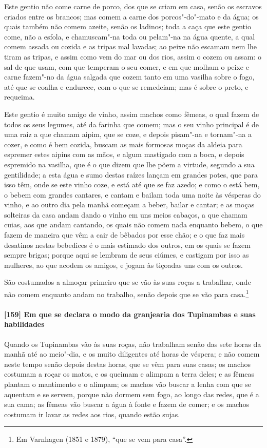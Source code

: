\begin{linenumbers}
Este gentio não come carne de porco, dos que se criam em casa, senão os escravos criados
entre os brancos; mas comem a carne dos porcos"-do"-mato e da água; os quais também não
comem azeite, senão os ladinos; toda a caça que este gentio come, não a esfola, e
chamuscam"-na toda ou pelam"-na na água quente, a qual comem assada ou cozida e as tripas
mal lavadas; ao peixe não escamam nem lhe tiram as tripas, e assim como vem do mar ou dos
rios, assim o cozem ou assam: o sal de que usam, com que temperam o seu comer, e em que
molham o peixe e carne fazem"-no da água salgada que cozem tanto em uma vasilha sobre o
fogo, até que se coalha e endurece, com o que se remedeiam; mas é sobre o preto, e
requeima.

Este gentio é muito amigo de vinho, assim machos como fêmeas, o qual fazem de todos os
seus legumes, até da farinha que comem; mas o seu vinho principal é de uma raiz a que
chamam aipim, que se coze, e depois pisam"-na e tornam"-na a cozer, e como é bem cozida,
buscam as mais formosas moças da aldeia para espremer estes aipins com as mãos, e algum
mastigado com a boca, e depois espremido na vasilha, que é o que dizem que lhe põem a
virtude, segundo a sua gentilidade; a esta água e sumo destas raízes lançam em grandes
potes, que para isso têm, onde se este vinho coze, e está até que se faz azedo; e como o
está bem, o bebem com grandes cantares, e cantam e bailam toda uma noite às vésperas do
vinho, e ao outro dia pela manhã começam a beber, bailar e cantar; e as moças solteiras da
casa andam dando o vinho em uns meios cabaços, a que chamam cuias, aos que andam cantando,
os quais não comem nada enquanto bebem, o que fazem de maneira que vêm a cair de bêbados
por esse chão; e o que faz mais desatinos nestas bebedices é o mais estimado dos outros,
em os quais se fazem sempre brigas; porque aqui se lembram de seus ciúmes, e castigam por
isso as mulheres, ao que acodem os amigos, e jogam às tiçoadas uns com os outros.

São costumados a almoçar primeiro que se vão às suas roças a trabalhar, onde não comem
enquanto andam no trabalho, senão depois que se vão para casa.\footnote{ Em Varnhagen
(1851 e 1879), ``que se vem para casa''.}

\paragraph{[159] Em que se declara o modo da granjearia dos Tupinambas e suas habilidades}\quad
Quando os Tupinambas vão às suas roças, não trabalham senão das sete horas da manhã até ao
meio"-dia, e os muito diligentes até horas de véspera; e não comem neste tempo senão depois
destas horas, que se vêm para suas casas; os machos costumam a roçar os matos, e os
queimam e alimpam a terra deles; e as fêmeas plantam o mantimento e o alimpam; os machos
vão buscar a lenha com que se aquentam e se servem, porque não dormem sem fogo, ao longo
das redes, que é a sua cama; as fêmeas vão buscar a água à fonte e fazem de comer; e os
machos costumam ir lavar as redes aos rios, quando estão sujas.


\end{linenumbers}
